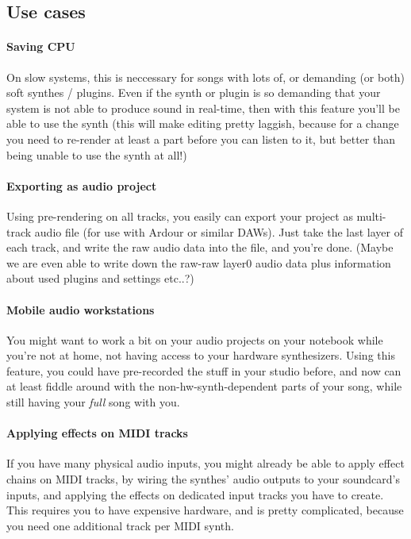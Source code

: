 \documentclass[a4paper]{report}
\begin{document}
\subsection{Use cases}
\paragraph{Saving CPU}
On slow systems, this is neccessary for songs with lots of, or demanding
(or both) soft synthes / plugins. Even if the synth or plugin is so
demanding that your system is not able to produce sound in real-time,
then with this feature you'll be able to use the synth (this will make
editing pretty laggish, because for a change you need to re-render at
least a part before you can listen to it, but better than being unable
to use the synth at all!)

\paragraph{Exporting as audio project}
Using pre-rendering on all tracks, you easily can export your project
as multi-track audio file (for use with Ardour or similar DAWs).
Just take the last layer of each track, and write the raw audio data
into the file, and you're done. (Maybe we are even able to write down
the raw-raw layer0 audio data plus information about used plugins and
settings etc..?)

\paragraph{Mobile audio workstations}
You might want to work a bit on your audio projects on your notebook
while you're not at home, not having access to your hardware synthesizers.
Using this feature, you could have pre-recorded the stuff in your studio
before, and now can at least fiddle around with the non-hw-synth-dependent
parts of your song, while still having your \emph{full} song with you.

\paragraph{Applying effects on MIDI tracks}
If you have many physical audio inputs, you might already be able to
apply effect chains on MIDI tracks, by wiring the synthes' audio
outputs to your soundcard's inputs, and applying the effects on
dedicated input tracks you have to create. This requires you to have
expensive hardware, and is pretty complicated, because you need one
additional track per MIDI synth.
\end{document}
